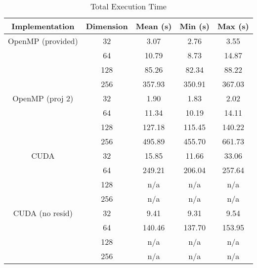 \documentclass{article}
\begin{document}
  \begin{table}[H]
    \centering

    \begin{tabular}{ c c c c c }
      \toprule
      Implementation    & Dimension & Mean (s)  & Min (s)   & Max (s)   \\
      \midrule
      OpenMP (provided) & 32        & 3.07      & 2.76      & 3.55      \\
                        & 64        & 10.79     & 8.73      & 14.87     \\
                        & 128       & 85.26     & 82.34     & 88.22     \\
                        & 256       & 357.93    & 350.91    & 367.03    \\
      \midrule
      OpenMP (proj 2)   & 32        & 1.90      & 1.83      & 2.02      \\
                        & 64        & 11.34     & 10.19     & 14.11     \\
                        & 128       & 127.18    & 115.45    & 140.22    \\
                        & 256       & 495.89    & 455.70    & 661.73    \\
      \midrule
      CUDA              & 32        & 15.85     & 11.66     & 33.06     \\
                        & 64        & 249.21    & 206.04    & 257.64    \\
                        & 128       & n/a       & n/a       & n/a       \\
                        & 256       & n/a       & n/a       & n/a       \\
      \midrule
      CUDA (no resid)   & 32        & 9.41      & 9.31      & 9.54      \\
                        & 64        & 140.46    & 137.70    & 153.95    \\
                        & 128       & n/a       & n/a       & n/a       \\
                        & 256       & n/a       & n/a       & n/a       \\
      \bottomrule
    \end{tabular}
    \caption{Total Execution Time}
    \label{tab:exectime}
  \end{table}
\end{document}
